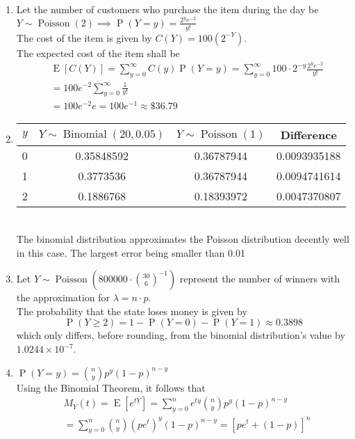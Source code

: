 \documentclass{article}
\newcommand{\pr}[1]{\operatorname{P}(#1)}
\newcommand{\expt}[1]{\operatorname{E}[#1]}
\newcommand{\binomdist}[3]{#1 \sim \operatorname{Binomial}(#2, #3)}
\newcommand{\poisson}[2]{#1 \sim \operatorname{Poisson}(#2)}
\begin{document}
\begin{enumerate}
  \item Let the number of customers who purchase the item during the day be
  $\poisson{Y}{2} \implies \pr{Y=y} = \frac{2^y e^{-2}}{y!}$\\
  The cost of the item is given by $C(Y) = 100(2^{-Y})$.\\
  The expected cost of the item shall be
  \begin{align*}
    & \expt{C(Y)} = \sum_{y=0}^{\infty}C(y)\pr{Y=y} 
    = \sum_{y=0}^{\infty}100\cdot 2^{-y}\frac{2^y e^{-2}}{y!}\\
    & = 100e^{-2}\sum_{y=0}^{\infty}\frac{1}{y!}\\
    & = 100e^{-2}e = 100e^{-1} \approx \$36.79
  \end{align*}

  \item
  \begin{tabular}{|c|c|c|c|}
    \hline
    $y$ & $\binomdist{Y}{20}{0.05}$ & $\poisson{Y}{1}$ & Difference\\\hline
    0 & 0.35848592 & 0.36787944 & 0.0093935188\\\hline
    1 & 0.3773536 & 0.36787944 & 0.0094741614\\\hline
    2 & 0.1886768 & 0.18393972 & 0.0047370807\\\hline
  \end{tabular}\\
  The binomial distribution approximates the Poisson distribution decently well in this case. The largest error being smaller than 0.01
  
  \newpage
  \item Let $\poisson{Y}{800000 \cdot \binom{30}{6}^{-1}}$ represent the number of
  winners with the approximation for $\lambda = n\cdot p$.\\
  The probability that the state loses money is given by
  \[
    \pr{Y\geq 2} = 1 - \pr{Y=0} - \pr{Y=1} \approx 0.3898
  \]
  which only differs, before rounding, from the binomial distribution's value by $1.0244\times10^{-7}$.

  \item $\pr{Y=y} = \binom{n}{y}p^{y}(1-p)^{n-y}$\\
  Using the Binomial Theorem, it follows that
  \begin{align*}
    & M_Y(t) = \expt{e^{tY}} = \sum_{y=0}^{n}e^{ty}\binom{n}{y}p^{y}(1-p)^{n-y}\\
    & = \sum_{y=0}^{n}\binom{n}{y}(pe^t)^{y}(1-p)^{n-y} = [pe^t + (1-p)]^n
  \end{align*}
  

\end{enumerate}
\end{document}

